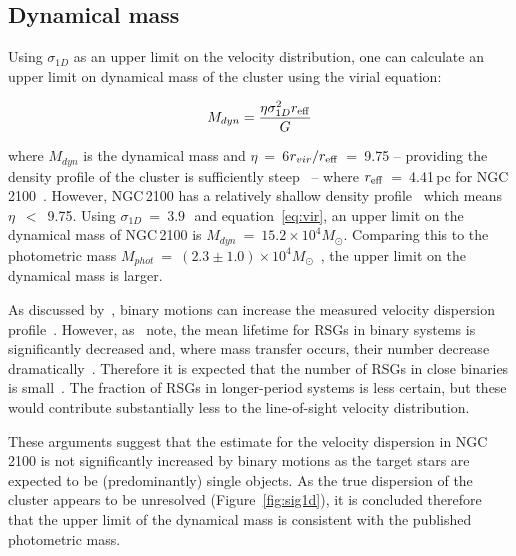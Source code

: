 
\subsection{Dynamical mass} %
\label{sub:dynamical_mass}
Using $\sigma_{1D}$ as an upper limit on the velocity distribution, one can calculate an upper limit on dynamical mass of the cluster using the virial equation:

\begin{equation}
  M_{dyn} = \frac{\eta\sigma_{1D}^{2}r_{\rm eff}}{G}
  \label{eq:vir}
\end{equation}

\noindent where $M_{dyn}$ is the dynamical mass and $\eta$~=~6$r_{vir}/r_{\rm eff}$~=~9.75 -- providing the density profile of the cluster is sufficiently steep~\citep{2010ARA&A..48..431P} --
where $r_{\rm eff}$~=~4.41\,pc for NGC\,2100~\citep{2005ApJS..161..304M}.
However, NGC\,2100 has a relatively shallow density profile~\citep[$\gamma$~=~$2.44\pm0.14$;][]{2003MNRAS.338...85M}
which means $\eta$~$<$~9.75.
Using $\sigma_{1D}$~=~$3.9$\,\kms~and equation~\ref{eq:vir}, an upper limit on the dynamical mass of NGC\,2100 is $M_{dyn}$~=~$15.2\times 10^{4}M_{\odot}$.
Comparing this to the photometric mass $M_{phot}$~=~$(2.3\pm1.0)\times 10^{4}M_{\odot}$~\citep{2005ApJS..161..304M},
the upper limit on the dynamical mass is larger.

As discussed by~\citet{2010MNRAS.402.1750G}, binary motions can increase the measured velocity dispersion profile~\citep[e.g. see][]{2012A&A...546A..73H}.
However, as~\citet{2010MNRAS.402.1750G} note, the mean lifetime for RSGs in binary systems is significantly decreased and, where mass transfer occurs, their number decrease dramatically~\citep{2008MNRAS.384.1109E}.
Therefore it is expected that the number of RSGs in close binaries is small~\citep{1979MNRAS.186..831F,2009ApJ...696.2014D}.
The fraction of RSGs in longer-period systems is less certain, but these would contribute substantially less to the line-of-sight velocity distribution.

These arguments suggest that the estimate for the velocity dispersion in NGC\,2100 is not significantly increased by binary motions as the target stars are expected to be (predominantly) single objects. As the true dispersion of the cluster appears to be unresolved (Figure~\ref{fig:sig1d}), it is concluded therefore that the upper limit of the dynamical mass is consistent with the published photometric mass.

